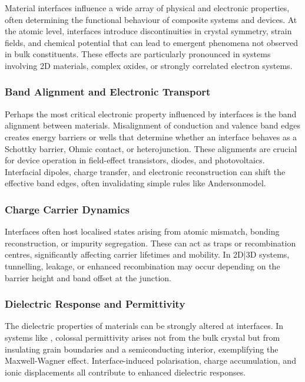 Material interfaces influence a wide array of physical and electronic properties, often determining the functional behaviour of composite systems and devices. At the atomic level, interfaces introduce discontinuities in crystal symmetry, strain fields, and chemical potential that can lead to emergent phenomena not observed in bulk constituents. These effects are particularly pronounced in systems involving 2D materials, complex oxides, or strongly correlated electron systems. 
 
\subsubsection{Band Alignment and Electronic Transport} 
 
Perhaps the most critical electronic property influenced by interfaces is the band alignment between materials. Misalignment of conduction and valence band edges creates energy barriers or wells that determine whether an interface behaves as a Schottky barrier, Ohmic contact, or heterojunction. These alignments are crucial for device operation in field-effect transistors, diodes, and photovoltaics. Interfacial dipoles, charge transfer, and electronic reconstruction can shift the effective band edges, often invalidating simple rules like Anderson\rqs model. 
 
\subsubsection{Charge Carrier Dynamics} 
 
Interfaces often host localised states arising from atomic mismatch, bonding reconstruction, or impurity segregation. These can act as traps or recombination centres, significantly affecting carrier lifetimes and mobility. In 2D|3D systems, tunnelling, leakage, or enhanced recombination may occur depending on the barrier height and band offset at the junction. 
 
\subsubsection{Dielectric Response and Permittivity} 
 
The dielectric properties of materials can be strongly altered at interfaces. In systems like , colossal permittivity arises not from the bulk crystal but from insulating grain boundaries and a semiconducting interior, exemplifying the Maxwell-Wagner effect. Interface-induced polarisation, charge accumulation, and ionic displacements all contribute to enhanced dielectric responses. 
 
